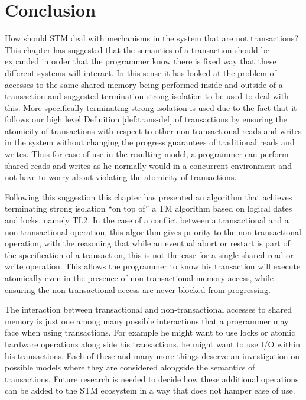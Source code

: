 \section{Conclusion}
\label{sec:conclusions}
How should STM deal with mechanisms in the system that are not transactions?
This chapter has suggested that the semantics of a transaction should be
expanded in order that the programmer know there is fixed way that
these different systems will interact.
In this sense it has looked at the problem of accesses to the same
shared memory being performed inside and outside of a transaction
and suggested termination strong isolation to be used to deal with this.
More specifically terminating strong isolation is used due to the fact that it follows
our high level Definition \ref{def:trans-def} of transactions by
ensuring the atomicity of transactions with respect to other non-transactional
reads and writes in the system without changing the progress guarantees
of traditional reads and writes.
Thus for ease of use in the resulting model, a programmer can perform shared reads and writes
as he normally would in a concurrent environment and not have to worry
about violating the atomicity of transactions.

Following this suggestion this chapter has presented an algorithm that achieves terminating strong 
isolation  ``on top of'' a TM algorithm based on logical dates and locks, 
namely  TL2. 
In the case of a conflict between a transactional and a non-transactional
operation, this algorithm gives priority to 
the non-transactional operation, 
with the reasoning that while an eventual abort or restart is part of the 
specification of a transaction,
this is not the case for a single shared read or write operation. 
This allows the programmer to know his transaction will execute atomically even
in the presence of non-transactional memory access, while ensuring the non-transactional
access are never blocked from progressing.

The interaction between transactional and non-transactional accesses to shared memory
is just one among many possible interactions that a programmer may face when using
transactions.
For example he might want to use locks or atomic hardware operations along side his transactions,
he might want to use I/O within his transactions.
Each of these and many more things deserve an investigation on possible models where
they are considered alongside the semantics of transactions.
Future research is needed to decide how these additional operations can be added
to the STM ecosystem in a way that does not hamper ease of use.









% 
% 